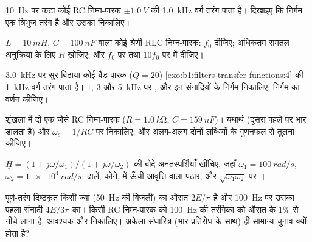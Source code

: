 \begin{exercise}[$\star\star$]\label{exo:b1:filters-transfer-functions:6}
\qty{10}{Hz} पर कटा कोई RC निम्न-पारक  $\pm\qty{1.0}{V}$ की \qty{1.0}{kHz}
वर्ग तरंग पाता है। दिखाइए कि निर्गम एक त्रिभुज तरंग है
और उसका  निकालिए।
\end{exercise}

\begin{exercise}[$\star\star$]\label{exo:b1:filters-transfer-functions:7}
$L = \qty{10}{mH}$, $C = \qty{100}{nF}$ वाला कोई श्रेणी RLC निम्न-पारक:
$f_0$ दीजिए; अधिकतम समतल अनुक्रिया के लिए $R$ खोजिए; और $f_0$ पर तथा
$10f_0$ पर  में  दीजिए।
\end{exercise}

\begin{exercise}[$\star\star$]\label{exo:b1:filters-transfer-functions:8}
\qty{3.0}{kHz} पर सुर बिठाया कोई बैंड-पारक ($Q = 20$)
\cref{exo:b1:filters-transfer-functions:4} की \qty{1}{kHz} वर्ग तरंग पाता है।
$1$, $3$ और \qty{5}{kHz} पर , और इन संनादियों के निर्गम  निकालिए;
निर्गम का वर्णन कीजिए।
\end{exercise}

\begin{exercise}[$\star\star$]\label{exo:b1:filters-transfer-functions:9}
शृंखला में दो एक जैसे RC निम्न-पारक ($R = \qty{1.0}{k\ohm}$, $C = \qty{159}{nF}$)।
यथार्थ  (दूसरा पहले पर भार डालता है) और $\omega_c = 1/RC$ पर
 निकालिए; और अलग-अलग दोनों लब्धियों के गुणनफल से तुलना कीजिए।
\end{exercise}

\begin{exercise}[$\star\star\star$]\label{exo:b1:filters-transfer-functions:10}
$\underline H = (1 + j\omega/\omega_1)/
(1 + j\omega/\omega_2)$ की बोदे अनंतस्पर्शियाँ खींचिए, जहाँ $\omega_1 = \qty{100}{rad/s}$, $\omega_2 =
\qty{1e4}{rad/s}$: ढालें, कोने,  में ऊँची-आवृत्ति वाला पठार,
और $\sqrt{\omega_1\omega_2}$ पर ।
\end{exercise}

\begin{exercise}[$\star\star\star$]\label{exo:b1:filters-transfer-functions:11}
पूर्ण-तरंग दिष्टकृत किसी ज्या (\qty{50}{Hz} की बिजली) का औसत $2E/\pi$ है और
\qty{100}{Hz} पर उसका पहला संनादी  $4E/3\pi$ का। किसी RC
निम्न-पारक को \qty{100}{Hz} की तरंगिका को औसत के $1\%$ से नीचे लाना है:
आवश्यक  और  निकालिए। अकेला संधारित्र
(भार-प्रतिरोध के साथ) ही सामान्य चुनाव क्यों होता है?
\end{exercise}

